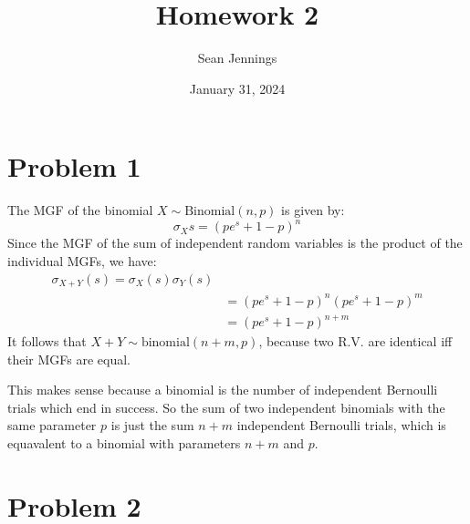 \documentclass{homework}
\title{Homework 2}
\author{Sean Jennings}
\date{January 31, 2024}
\begin{document}
\maketitle

\section{Problem 1}
The MGF of the binomial $X \sim \text{Binomial}(n, p)$ is given by:
\begin{equation*}
    \sigma_X{s} = (pe^s + 1 - p)^n
\end{equation*}
Since the MGF of the sum of independent random variables is the product of
the individual MGFs, we have:
\begin{align*}
    \sigma_{X+Y}(s) = \sigma_X(s) \sigma_Y(s) \\
        &= (pe^s + 1 - p)^n (pe^s + 1 - p)^m \\
        &= (pe^s + 1 - p)^{n + m}
\end{align*}
It follows that $X+Y \sim \text{binomial}(n+m, p)$, because two R.V. are identical
iff their MGFs are equal.

This makes sense because a binomial is the number of independent Bernoulli trials
which end in success. So the sum of two independent binomials with the same
parameter $p$ is just the sum $n+m$ independent Bernoulli trials,
which is equavalent to a binomial with parameters $n+m$ and $p$.

\section{Problem 2}
\end{document}
